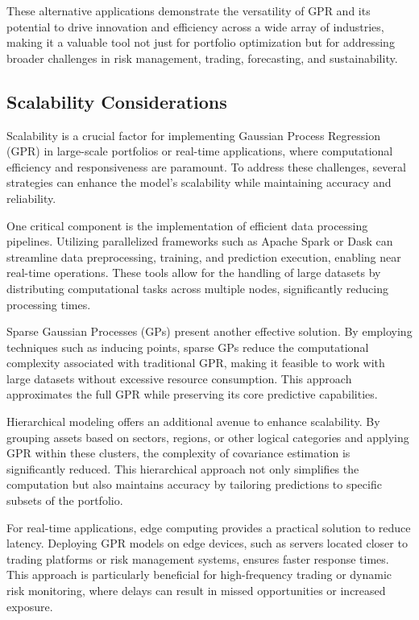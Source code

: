 These alternative applications demonstrate the versatility of GPR and its potential to drive innovation and efficiency across a wide array of industries, making it a valuable tool not just for portfolio optimization but for addressing broader challenges in risk management, trading, forecasting, and sustainability.

\subsection{Scalability Considerations}
Scalability is a crucial factor for implementing Gaussian Process Regression (GPR) in large-scale portfolios or real-time applications, where computational efficiency and responsiveness are paramount. To address these challenges, several strategies can enhance the model's scalability while maintaining accuracy and reliability.

One critical component is the implementation of efficient data processing pipelines. Utilizing parallelized frameworks such as Apache Spark or Dask can streamline data preprocessing, training, and prediction execution, enabling near real-time operations. These tools allow for the handling of large datasets by distributing computational tasks across multiple nodes, significantly reducing processing times.

Sparse Gaussian Processes (GPs) present another effective solution. By employing techniques such as inducing points, sparse GPs reduce the computational complexity associated with traditional GPR, making it feasible to work with large datasets without excessive resource consumption. This approach approximates the full GPR while preserving its core predictive capabilities.

Hierarchical modeling offers an additional avenue to enhance scalability. By grouping assets based on sectors, regions, or other logical categories and applying GPR within these clusters, the complexity of covariance estimation is significantly reduced. This hierarchical approach not only simplifies the computation but also maintains accuracy by tailoring predictions to specific subsets of the portfolio.

For real-time applications, edge computing provides a practical solution to reduce latency. Deploying GPR models on edge devices, such as servers located closer to trading platforms or risk management systems, ensures faster response times. This approach is particularly beneficial for high-frequency trading or dynamic risk monitoring, where delays can result in missed opportunities or increased exposure.

